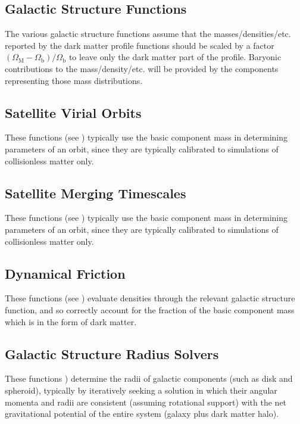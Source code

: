 \subsection{Galactic Structure Functions}

The various galactic structure functions assume that the masses/densities/etc. reported by the dark matter profile functions should be scaled by a factor $(\Omega_\mathrm{M}-\Omega_\mathrm{b})/\Omega_\mathrm{b}$ to leave only the dark matter part of the profile. Baryonic contributions to the mass/density/etc. will be provided by the components representing those mass distributions.

\subsection{Satellite Virial Orbits}

These functions (see ) typically use the {\normalfont \ttfamily basic} component mass in determining parameters of an orbit, since they are typically calibrated to simulations of collisionless matter only.

\subsection{Satellite Merging Timescales}

These functions (see ) typically use the {\normalfont \ttfamily basic} component mass in determining parameters of an orbit, since they are typically calibrated to simulations of collisionless matter only.

\subsection{Dynamical Friction}

These functions (see ) evaluate densities through the relevant galactic structure function, and so correctly account for the fraction of the {\normalfont \ttfamily basic} component mass which is in the form of dark matter.

\subsection{Galactic Structure Radius Solvers}

These functions ) determine the radii of galactic components (such as disk and spheroid), typically by iteratively seeking a solution in which their angular momenta and radii are consistent (assuming rotational support) with the net gravitational potential of the entire system (galaxy plus dark matter halo).

